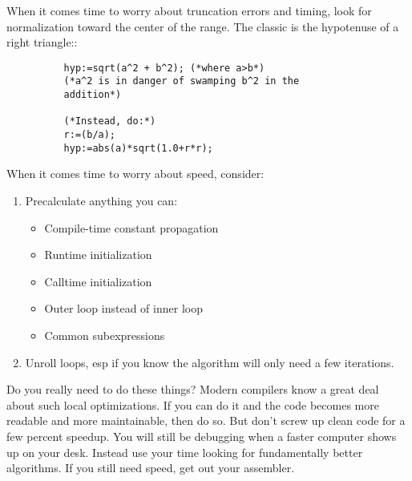 When it comes time to worry about truncation errors and
timing, look for normalization toward the center of the
range.  The classic is the hypotenuse of a right triangle::
\begin{verbatim}
          hyp:=sqrt(a^2 + b^2); (*where a>b*)
          (*a^2 is in danger of swamping b^2 in the
          addition*)
          
          (*Instead, do:*)
          r:=(b/a);
          hyp:=abs(a)*sqrt(1.0+r*r);
\end{verbatim}

When it comes time to worry about speed, consider:
\begin{enumerate}
     \item Precalculate anything you can:
     \begin{itemize}
          \item Compile-time constant propagation
          \item Runtime initialization
          \item Calltime initialization
          \item Outer loop instead of inner loop
          \item Common subexpressions
      \end{itemize}

     \item Unroll loops, esp if you know the algorithm will
     only need a few iterations.
\end{enumerate}
     
Do you really need to do these things?  Modern compilers
know a great deal about such local optimizations.  If you
can do it and the code becomes more readable and more
maintainable, then do so.  But don't screw up clean code for
a few percent speedup.  You will still be debugging when a
faster computer shows up on your desk.  Instead use your
time looking for fundamentally better algorithms.  If you
still need speed, get out your assembler.
